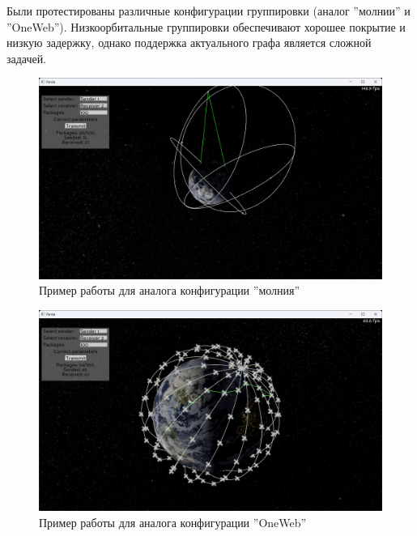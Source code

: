 Были протестированы различные конфигурации группировки (аналог ''молнии'' и ''OneWeb''). Низкоорбитальные группировки обеспечивают хорошее покрытие и низкую задержку, однако поддержка актуального графа является сложной задачей.

\begin{figure}[H]
    \centering
    \includegraphics[width=0.9\linewidth]{image_1.png}
    \caption{Пример работы для аналога конфигурации ''молния''}
    \label{fig:image_1}
\end{figure}

\begin{figure}[H]
    \centering
    \includegraphics[width=0.9\linewidth]{image_2.png}
    \caption{Пример работы для аналога конфигурации ''OneWeb''}
    \label{fig:image_2}
\end{figure}